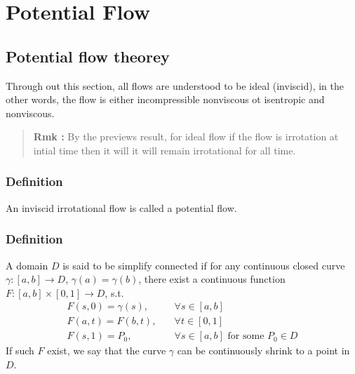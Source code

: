 \section{Potential Flow} %

\subsection{Potential flow theorey} %

Through out this section, all flows are understood to be ideal (inviscid), in the other words, the flow is either incompressible nonviscous ot isentropic and nonviscous.

\begin{quote}
	\textbf{Rmk :}
By the previews result, for ideal flow if the flow is irrotation at intial time then it will it will remain irrotational for all time.
\end{quote}

\subsubsection{Definition} %

An inviscid irrotational flow is called a potential flow.

\subsubsection{Definition} %

A domain $D$ is said to be simplify connected if for any continuous closed curve $\gamma :[a,b]\to D$, $\gamma(a)=\gamma(b)$, there exist a continuous function $F:[a,b]\times [0,1]\to D$, s.t.
\begin{equation}
\begin{aligned}
F(s,0) = \gamma(s),&\quad \forall s\in [a,b]\\
F(a,t) = F(b,t),&\quad \forall t\in [0,1]\\
F(s,1) = P_0,&\quad \forall s \in [a,b] \text{ for some $P_0 \in D$}
\end{aligned}
\end{equation}
If such $F$ exist, we say that the curve $\gamma$ can be continuously shrink to a point in $D$.
